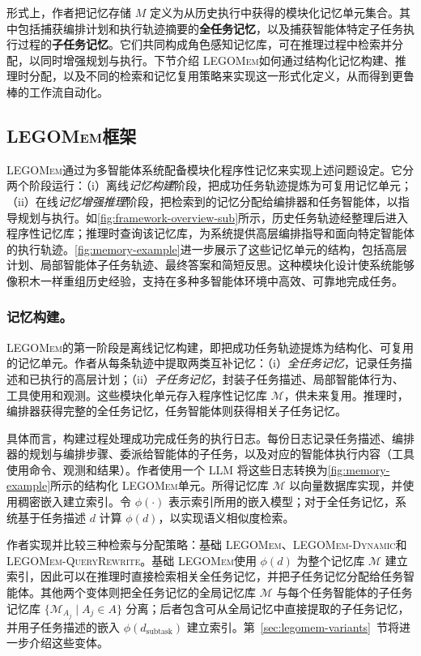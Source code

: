 \documentclass[10pt,twocolumn]{article}
\newcommand{\legomem}{\textsc{LEGOMem}}
\newcommand{\dynalegomem}{\textsc{LEGOMem-Dynamic}}
\newcommand{\queryrewritelegomem}{\textsc{LEGOMem-QueryRewrite}}
\begin{document}
形式上，作者把记忆存储 $M$ 定义为从历史执行中获得的模块化记忆单元集合。其中包括捕获编排计划和执行轨迹摘要的\textbf{全任务记忆}，以及捕获智能体特定子任务执行过程的\textbf{子任务记忆}。它们共同构成角色感知记忆库，可在推理过程中检索并分配，以同时增强规划与执行。下节介绍 \legomem 如何通过结构化记忆构建、推理时分配，以及不同的检索和记忆复用策略来实现这一形式化定义，从而得到更鲁棒的工作流自动化。

\subsection{\legomem 框架}
\label{sec:legomem-framework}

\legomem 通过为多智能体系统配备模块化程序性记忆来实现上述问题设定。它分两个阶段运行：（i）离线\emph{记忆构建}阶段，把成功任务轨迹提炼为可复用记忆单元；（ii）在线\emph{记忆增强推理}阶段，把检索到的记忆分配给编排器和任务智能体，以指导规划与执行。如\autoref{fig:framework-overview-sub}所示，历史任务轨迹经整理后进入程序性记忆库；推理时查询该记忆库，为系统提供高层编排指导和面向特定智能体的执行轨迹。\autoref{fig:memory-example}进一步展示了这些记忆单元的结构，包括高层计划、局部智能体子任务轨迹、最终答案和简短反思。这种模块化设计使系统能够像积木一样重组历史经验，支持在多种多智能体环境中高效、可靠地完成任务。

\subsubsection{记忆构建。}
\legomem 的第一阶段是离线记忆构建，即把成功任务轨迹提炼为结构化、可复用的记忆单元。作者从每条轨迹中提取两类互补记忆：（i）\emph{全任务记忆}，记录任务描述和已执行的高层计划；（ii）\emph{子任务记忆}，封装子任务描述、局部智能体行为、工具使用和观测。这些模块化单元存入程序性记忆库 $\mathcal{M}$，供未来复用。推理时，编排器获得完整的全任务记忆，任务智能体则获得相关子任务记忆。

具体而言，构建过程处理成功完成任务的执行日志。每份日志记录任务描述、编排器的规划与编排步骤、委派给智能体的子任务，以及对应的智能体执行内容（工具使用命令、观测和结果）。作者使用一个 LLM 将这些日志转换为\autoref{fig:memory-example}所示的结构化 \legomem 单元。所得记忆库 $\mathcal{M}$ 以向量数据库实现，并使用稠密嵌入建立索引。令 $\phi(\cdot)$ 表示索引所用的嵌入模型；对于全任务记忆，系统基于任务描述 $d$ 计算 $\phi(d)$，以实现语义相似度检索。

作者实现并比较三种检索与分配策略：基础 \legomem、\dynalegomem 和 \queryrewritelegomem。基础 \legomem 使用 $\phi(d)$ 为整个记忆库 $\mathcal{M}$ 建立索引，因此可以在推理时直接检索相关全任务记忆，并把子任务记忆分配给任务智能体。其他两个变体则把全任务记忆的全局记忆库 $\mathcal{M}$ 与每个任务智能体的子任务记忆库 $\{\mathcal{M}_{A_j}\mid A_j\in A\}$ 分离；后者包含可从全局记忆中直接提取的子任务记忆，并用子任务描述的嵌入 $\phi(d_{\text{subtask}})$ 建立索引。第~\ref{sec:legomem-variants}~节将进一步介绍这些变体。
\end{document}
